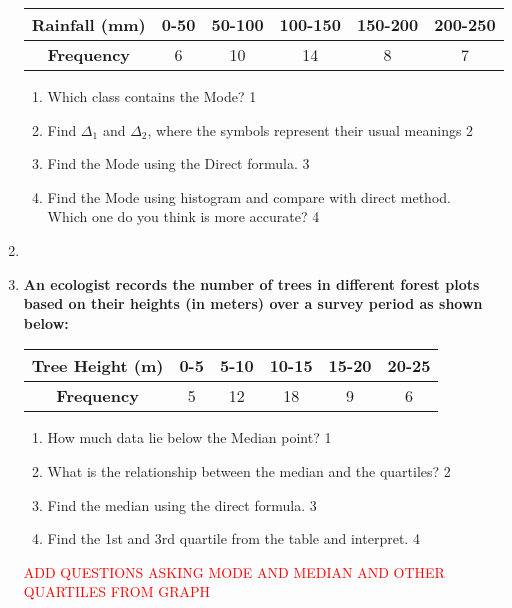 \documentclass[a4paper,oneside]{book}
\begin{document}
\begin{enumerate}
\begin{table}[h]
\centering
\begin{tabular}{c|c|c|c|c|c}
\textbf{Rainfall (mm)} & 0-50 & 50-100 & 100-150 & 150-200 & 200-250 \\ \hline
\textbf{Frequency}     & 6    & 10     & 14      & 8       & 7       
\end{tabular}
\end{table}

  
  \begin{enumerate}
    \item
	Which class contains the Mode? \hfill 1
    \item
	Find $\Delta_1$ and $\Delta_2$, where the symbols represent their usual meanings \hfill 2
    \item  
	Find the Mode using the Direct formula. \hfill 3
    \item
	Find the Mode using histogram and compare with direct method. \\ Which one do you think is more accurate? \hfill 4
  \end{enumerate}
  
  
   \item
	  \item
\textbf{An ecologist records the number of trees in different forest plots based on their heights (in meters) over a survey period as shown below:}

\begin{table}[h]
\centering
\begin{tabular}{c|c|c|c|c|c}
\textbf{Tree Height (m)} & 0-5 & 5-10 & 10-15 & 15-20 & 20-25 \\ \hline
\textbf{Frequency}       & 5   & 12   & 18    & 9     & 6      
\end{tabular}
\end{table}

  
  \begin{enumerate}
    \item
	How much data lie below the Median point? \hfill 1
    \item
	What is the relationship between the median and the quartiles? \hfill 2
    \item  
	Find the median using the direct formula. \hfill 3
    \item
	Find the 1st and 3rd quartile from the table and interpret. \hfill 4
  \end{enumerate}
  
  \textcolor{red}{ADD QUESTIONS ASKING MODE AND MEDIAN AND OTHER QUARTILES FROM GRAPH}


\end{enumerate}
\end{document}
